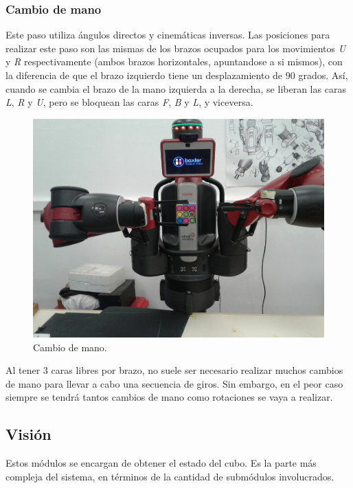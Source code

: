 \subsubsection{Cambio de mano}
Este paso utiliza ángulos directos y cinemáticas inversas. Las posiciones para realizar este paso son las mismas de los brazos ocupados para los movimientos \textit{U} y \textit{R} respectivamente (ambos brazos horizontales, apuntandose a si mismos), con la diferencia de que el brazo izquierdo tiene un desplazamiento de $90$ grados. Así, cuando se cambia el brazo de la mano izquierda a la derecha, se liberan las caras \textit{L}, \textit{R} y \textit{U}, pero se bloquean las caras \textit{F}, \textit{B} y \textit{L}, y viceversa.

\begin{figure}[h!]
	\centering
	\includegraphics[scale=0.1]{figures/switch}
	\caption{Cambio de mano.}
	\label{switch}
\end{figure}

Al tener 3 caras libres por brazo, no suele ser necesario realizar muchos cambios de mano para llevar a cabo una secuencia de giros. Sin embargo, en el peor caso siempre se tendrá tantos cambios de mano como rotaciones se vaya a realizar.

\subsection{Visión}
Estos módulos se encargan de obtener el estado del cubo. Es la parte más compleja del sistema, en términos de la cantidad de submódulos involucrados.
